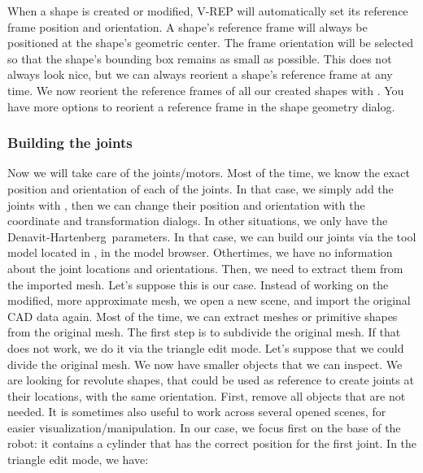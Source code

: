 
When a shape is created or modified, V-REP will automatically set its reference
frame position and orientation. A shape's reference frame will always be 
positioned at the shape's geometric center. The frame orientation will be 
selected so that the shape's bounding box remains as small as possible. This 
does not always look nice, but we can always reorient a shape's reference 
frame at any time. We now reorient the reference frames of all our created 
shapes with . You have more options to reorient a reference frame in the shape 
geometry dialog.

\subsubsection{Building the joints}

Now we will take care of the joints/motors. Most of the time, we know the 
exact position and orientation of each of the joints. In that case, we simply 
add the joints with , then we can change their 
position and orientation with the coordinate and transformation dialogs. In 
other situations, we only have the Denavit-Hartenberg\ parameters. 
In that case, we can build our joints via the tool model located in 
, in the model browser.
Othertimes, we have no information about the joint locations and orientations. 
Then, we need to extract them from the imported mesh. Let's suppose this is 
our case. Instead of working on the modified, more approximate mesh, we open a 
new scene, and import the original CAD data again. Most of the time, we can 
extract meshes or primitive shapes from the original mesh. The first step is 
to subdivide the original mesh. If that does not work, we do it via the 
triangle edit mode. Let's suppose that we could divide the original mesh. We 
now have smaller objects that we can inspect. We are looking for revolute 
shapes, that could be used as reference to create joints at their locations, 
with the same orientation. First, remove all objects that are not needed. It 
is sometimes also useful to work across several opened scenes, for easier 
visualization/manipulation. In our case, we focus first on the base of the
robot: it contains a cylinder that has the correct position for the first 
joint. In the triangle edit mode, we have:

